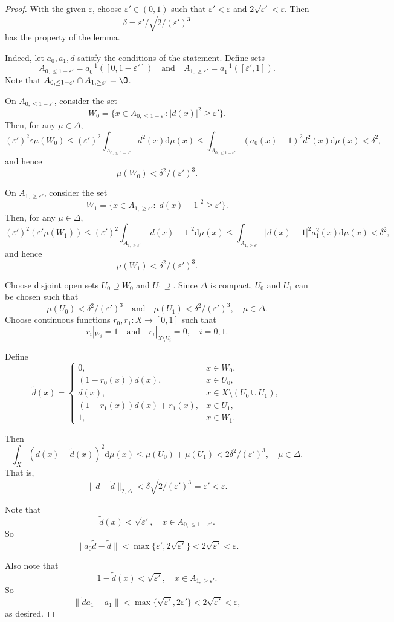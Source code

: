 \documentclass[12pt, oneside, psamsfonts]{amsart}
\theoremstyle{definition}
\theoremstyle{remark}
\numberwithin{equation}{section}
\newcommand{\norm}[1]{\| #1\|}
\newcommand{\abs}[1]{| #1 |}
\newcommand{\eps}{\varepsilon}
\begin{document}
\begin{proof}
With the given $\eps$, choose $\eps' \in (0, 1)$ such that $\eps' < \eps$ and $2\sqrt{\eps'}< \eps$.
Then $$\delta= \eps'/\sqrt{2/(\eps')^3} 
$$
has the property of the lemma.

Indeed, let $a_0, a_1, d$ satisfy the conditions of the statement. Define sets 
$$A_{0, \leq 1-\eps'} = a_0^{-1}([0, 1-\eps']) \quad \mathrm{and}\quad A_{1, \geq \eps'} = a_1^{-1}([\eps', 1]).$$ Note that $A_{0, \leq 1-\eps'} \cap A_{1, \geq \eps'} = \O$.

On $A_{0, \leq 1-\eps'}$, consider the set
$$W_0 = \{x \in A_{0, \leq 1-\eps'}: \abs{d(x)}^2 \geq \eps'\}.$$ Then, for any $\mu \in \Delta$,
$$
(\eps')^2 \eps \mu(W_0) \leq (\eps')^2 \int_{A_{0, \leq 1-\eps'}} d^2(x) \mathrm{d}\mu(x) \leq \int_{A_{0, \leq 1-\eps'}} (a_0(x) - 1)^2d^2(x) \mathrm{d}\mu(x) < \delta^2,
$$
and hence
$$\mu(W_0) < \delta^2/(\eps')^3.$$

On $A_{1, \geq \eps'}$, consider the set
$$W_1 = \{x \in A_{1, \geq \eps'}: \abs{d(x) - 1}^2 \geq \eps'\}.$$ Then, for any $\mu \in \Delta$,
$$
(\eps')^2(\eps' \mu(W_1)) \leq (\eps')^2 \int_{A_{1, \geq \eps'}}\abs{d(x) - 1}^2 \mathrm{d}\mu(x) \leq \int_{A_{1, \geq \eps'}}\abs{d(x) - 1}^2 a_1^2(x) \mathrm{d}\mu(x) < \delta^2,
$$
and hence
$$\mu(W_1) < \delta^2/(\eps')^3.$$

Choose disjoint open sets $U_0 \supseteq W_0$ and $U_1 \supseteq$. Since $\Delta$ is compact, $U_0$ and $U_1$ can be chosen such that
$$ \mu(U_0) < \delta^2/(\eps')^3 \quad \mathrm{and} \quad \mu(U_1) < \delta^2/(\eps')^3,\quad \mu \in \Delta.$$ Choose continuous functions $r_0, r_1: X \to [0, 1]$ such that
$$r_i|_{W_i} = 1 \quad \mathrm{and} \quad r_i|_{X \setminus U_i} = 0,\quad i=0, 1.$$


Define 
$$
\tilde{d}(x) = \left\{
\begin{array}{ll}
0, & x \in W_0,\\
(1-r_0(x))d(x), & x \in U_0, \\
d(x), & x \in X \setminus (U_0 \cup U_1), \\
(1-r_1(x))d(x) + r_1(x), & x \in U_1, \\
1, & x \in W_1.
\end{array}
\right. 
$$

Then 
$$\int_X(d(x) - \tilde{d}(x))^2 \mathrm{d}\mu(x) \leq \mu(U_0) + \mu(U_1) < 2\delta^2/(\eps')^3,\quad \mu \in \Delta.$$ That is,
$$ \norm{d - \tilde{d}}_{2, \Delta} < \delta \sqrt{2/(\eps')^3} = \eps' < \eps.$$

Note that
$$\tilde{d}(x) < \sqrt{\eps'},\quad x \in A_{0, \leq 1-\eps'}.$$
So
$$\norm{a_0 \tilde{d} - \tilde{d}} < \max\{\eps', 2\sqrt{\eps'}\} < 2\sqrt{\eps'} < \eps.$$

Also note that
$$1-\tilde{d}(x) < \sqrt{\eps'}, \quad x \in A_{1, \geq \eps'}.$$
So
$$\norm{\tilde{d} a_1 - a_1} < \max\{\sqrt{\eps'}, 2\eps'\} < 2\sqrt{\eps'} < \eps,$$
as desired.
\end{proof}
\end{document}
